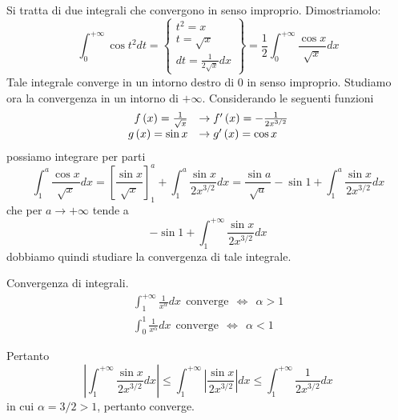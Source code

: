 Si tratta di due integrali che convergono in senso improprio. Dimostriamolo:
\begin{equation*}
\int\nolimits ^{+\infty }_{0}\cos t^{2} dt=\left\{\begin{array}{ c }
t^{2} =x\\
t=\sqrt{x}\\
dt=\frac{1}{2\sqrt{x}} dx
\end{array}\right\} =\frac{1}{2}\int\nolimits ^{+\infty }_{0}\frac{\cos x}{\sqrt{x}} dx
\end{equation*}
Tale integrale converge in un intorno destro di $0$ in senso improprio. Studiamo ora la convergenza in un intorno di $+\infty $. Considerando le seguenti funzioni
\begin{equation*}
\begin{array}{ r l }
f\left( x\right) =\frac{1}{\sqrt{x}} & \rightarrow f'\left( x\right) =-\frac{1}{2x^{3/2}}\\
g\left( x\right) =\sin x & \rightarrow g'\left( x\right) =\cos x
\end{array}
\end{equation*}
possiamo integrare per parti
\begin{equation*}
\int\nolimits ^{a}_{1}\frac{\cos x}{\sqrt{x}} dx=\left[\frac{\sin x}{\sqrt{x}}\right]^{a}_{1} +\int\nolimits ^{a}_{1}\frac{\sin x}{2x^{3/2}} dx=\frac{\sin a}{\sqrt{a}} -\sin 1+\int\nolimits ^{a}_{1}\frac{\sin x}{2x^{3/2}} dx
\end{equation*}
che per $a\rightarrow +\infty $ tende a
\begin{equation*}
-\sin 1+\int\nolimits ^{+\infty }_{1}\frac{\sin x}{2x^{3/2}} dx
\end{equation*}
dobbiamo quindi studiare la convergenza di tale integrale.
\begin{rem}
Convergenza di integrali.
\begin{gather*}
\int\nolimits ^{+\infty }_{1}\frac{1}{x^{\alpha }} dx\ \ \text{converge} \ \ \iff \ \ \alpha  >1\\
\int\nolimits ^{1}_{0}\frac{1}{x^{\alpha }} dx\ \ \text{converge} \ \ \iff \ \ \alpha < 1
\end{gather*}
\end{rem}
Pertanto
\begin{equation*}
\left| \int\nolimits ^{+\infty }_{1}\frac{\sin x}{2x^{3/2}} dx\right| \leqslant \int\nolimits ^{+\infty }_{1}\left| \frac{\sin x}{2x^{3/2}}\right| dx\leqslant \int\nolimits ^{+\infty }_{1}\frac{1}{2x^{3/2}} dx
\end{equation*}
in cui $\alpha =3/2 >1$, pertanto converge.

